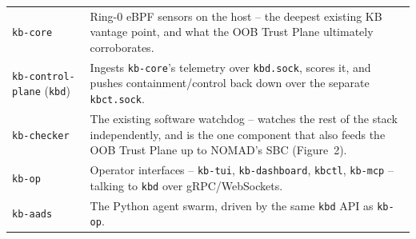 \documentclass[11pt,a4paper]{article}
\begin{document}
\begin{center}
\begin{tabular}{@{}p{3.6cm}p{10.6cm}@{}}
\texttt{kb-core} & Ring-0 eBPF sensors on the host -- the deepest existing KB vantage point, and what the OOB Trust Plane ultimately corroborates. \\
\texttt{kb-control-plane} (\texttt{kbd}) & Ingests \texttt{kb-core}'s telemetry over \texttt{kbd.sock}, scores it, and pushes containment/control back down over the separate \texttt{kbct.sock}. \\
\texttt{kb-checker} & The existing software watchdog -- watches the rest of the stack independently, and is the one component that also feeds the OOB Trust Plane up to NOMAD's SBC (Figure~2). \\
\texttt{kb-op} & Operator interfaces -- \texttt{kb-tui}, \texttt{kb-dashboard}, \texttt{kbctl}, \texttt{kb-mcp} -- talking to \texttt{kbd} over gRPC/WebSockets. \\
\texttt{kb-aads} & The Python agent swarm, driven by the same \texttt{kbd} API as \texttt{kb-op}. \\
\bottomrule
\end{tabular}
\end{center}
\end{document}
